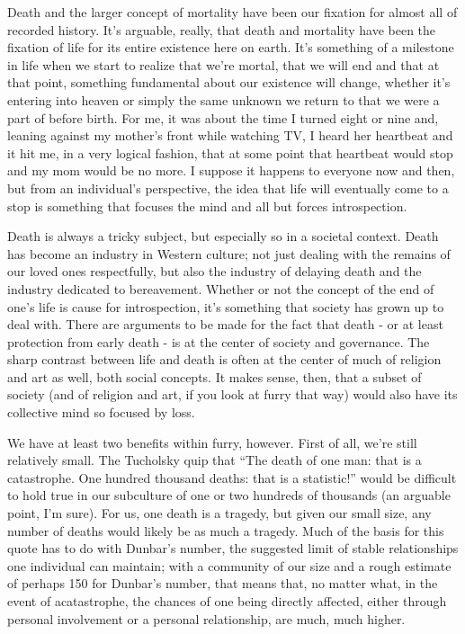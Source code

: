 Death and the larger concept of mortality have been our fixation for almost all of recorded history. It's arguable, really, that death and mortality have been the fixation of life for its entire existence here on earth. It's something of a milestone in life when we start to realize that we're mortal, that we will end and that at that point, something fundamental about our existence will change, whether it's entering into heaven or simply the same unknown we return to that we were a part of before birth. For me, it was about the time I turned eight or nine and, leaning against my mother's front while watching TV, I heard her heartbeat and it hit me, in a very logical fashion, that at some point that heartbeat would stop and my mom would be no more. I suppose it happens to everyone now and then, but from an individual's perspective, the idea that life will eventually come to a stop is something that focuses the mind and all but forces introspection.

Death is always a tricky subject, but especially so in a societal context. Death has become an industry in Western culture; not just dealing with the remains of our loved ones respectfully, but also the industry of delaying death and the industry dedicated to bereavement. Whether or not the concept of the end of one's life is cause for introspection, it's something that society has grown up to deal with. There are arguments to be made for the fact that death - or at least protection from early death - is at the center of society and governance. The sharp contrast between life and death is often at the center of much of religion and art as well, both social concepts. It makes sense, then, that a subset of society (and of religion and art, if you look at furry that way) would also have its collective mind so focused by loss.

We have at least two benefits within furry, however. First of all, we're still relatively small. The Tucholsky quip that ``The death of one man: that is a catastrophe. One hundred thousand deaths: that is a statistic!'' would be difficult to hold true in our subculture of one or two hundreds of thousands (an arguable point, I'm sure). For us, one death is a tragedy, but given our small size, any number of deaths would likely be as much a tragedy. Much of the basis for this quote has to do with Dunbar's number, the suggested limit of stable relationships one individual can maintain; with a community of our size and a rough estimate of perhaps 150 for Dunbar's number, that means that, no matter what, in the event of acatastrophe, the chances of one being directly affected, either through personal involvement or a personal relationship, are much, much higher.

